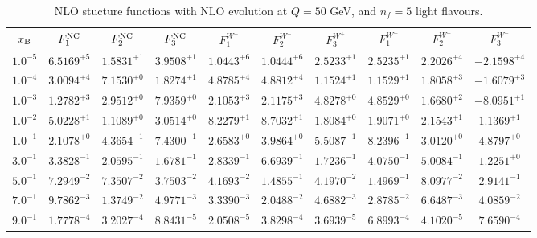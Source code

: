 \begin{table}[h]
\begin{adjustbox}{width=\textwidth}
\begin{tabular}{|c||c|c|c|c|c|c|c|c|c|}
\hline
$x_{\rm B}$ & $F_1^{\rm NC}$ & $F_2^{\rm NC}$ & $F_3^{\rm NC}$ & $F_1^{W^+}$ & $F_2^{W^+}$ & $F_3^{W^+}$ & $F_1^{W^-}$ & $F_2^{W^-}$ & $F_3^{W^-}$ \\
\hline
$ 1.0^{-5}$ & $ 6.5169^{+5}$ & $ 1.5831^{+1}$ & $ 3.9508^{+1}$ & $ 1.0443^{+6}$ & $ 1.0444^{+6}$ & $ 2.5233^{+1}$ & $ 2.5235^{+1}$ & $ 2.2026^{+4}$ & $-2.1598^{+4}$ \\
$ 1.0^{-4}$ & $ 3.0094^{+4}$ & $ 7.1530^{+0}$ & $ 1.8274^{+1}$ & $ 4.8785^{+4}$ & $ 4.8812^{+4}$ & $ 1.1524^{+1}$ & $ 1.1529^{+1}$ & $ 1.8058^{+3}$ & $-1.6079^{+3}$ \\
$ 1.0^{-3}$ & $ 1.2782^{+3}$ & $ 2.9512^{+0}$ & $ 7.9359^{+0}$ & $ 2.1053^{+3}$ & $ 2.1175^{+3}$ & $ 4.8278^{+0}$ & $ 4.8529^{+0}$ & $ 1.6680^{+2}$ & $-8.0951^{+1}$ \\
$ 1.0^{-2}$ & $ 5.0228^{+1}$ & $ 1.1089^{+0}$ & $ 3.0514^{+0}$ & $ 8.2279^{+1}$ & $ 8.7032^{+1}$ & $ 1.8084^{+0}$ & $ 1.9071^{+0}$ & $ 2.1543^{+1}$ & $ 1.1369^{+1}$ \\
$ 1.0^{-1}$ & $ 2.1078^{+0}$ & $ 4.3654^{-1}$ & $ 7.4300^{-1}$ & $ 2.6583^{+0}$ & $ 3.9864^{+0}$ & $ 5.5087^{-1}$ & $ 8.2396^{-1}$ & $ 3.0120^{+0}$ & $ 4.8797^{+0}$ \\
$ 3.0^{-1}$ & $ 3.3828^{-1}$ & $ 2.0595^{-1}$ & $ 1.6781^{-1}$ & $ 2.8339^{-1}$ & $ 6.6939^{-1}$ & $ 1.7236^{-1}$ & $ 4.0750^{-1}$ & $ 5.0084^{-1}$ & $ 1.2251^{+0}$ \\
$ 5.0^{-1}$ & $ 7.2949^{-2}$ & $ 7.3507^{-2}$ & $ 3.7503^{-2}$ & $ 4.1693^{-2}$ & $ 1.4855^{-1}$ & $ 4.1970^{-2}$ & $ 1.4969^{-1}$ & $ 8.0977^{-2}$ & $ 2.9141^{-1}$ \\
$ 7.0^{-1}$ & $ 9.7862^{-3}$ & $ 1.3749^{-2}$ & $ 4.9771^{-3}$ & $ 3.3390^{-3}$ & $ 2.0488^{-2}$ & $ 4.6882^{-3}$ & $ 2.8785^{-2}$ & $ 6.6487^{-3}$ & $ 4.0859^{-2}$ \\
$ 9.0^{-1}$ & $ 1.7778^{-4}$ & $ 3.2027^{-4}$ & $ 8.8431^{-5}$ & $ 2.0508^{-5}$ & $ 3.8298^{-4}$ & $ 3.6939^{-5}$ & $ 6.8993^{-4}$ & $ 4.1020^{-5}$ & $ 7.6590^{-4}$ \\
\hline
\end{tabular}
\end{adjustbox}\caption{NLO stucture functions with NLO evolution at $Q = 50$ GeV, and $n_f=5$ light flavours.}
\label{tab:N1LO-Q50}
\end{table}


